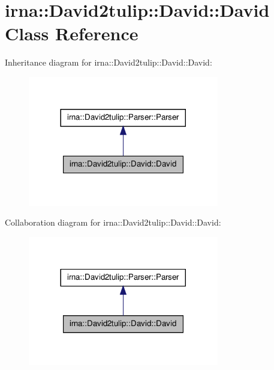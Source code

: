 \hypertarget{classirna_1_1David2tulip_1_1David_1_1David}{
\section{irna\-:\-:\-David2tulip\-:\-:\-David\-:\-:\-David \-Class \-Reference}
\label{classirna_1_1David2tulip_1_1David_1_1David}
}


\-Inheritance diagram for irna\-:\-:\-David2tulip\-:\-:\-David\-:\-:\-David\-:\nopagebreak
\begin{figure}[H]
\begin{center}
\leavevmode
\includegraphics[width=236pt]{classirna_1_1David2tulip_1_1David_1_1David__inherit__graph}
\end{center}
\end{figure}


\-Collaboration diagram for irna\-:\-:\-David2tulip\-:\-:\-David\-:\-:\-David\-:\nopagebreak
\begin{figure}[H]
\begin{center}
\leavevmode
\includegraphics[width=236pt]{classirna_1_1David2tulip_1_1David_1_1David__coll__graph}
\end{center}
\end{figure}
